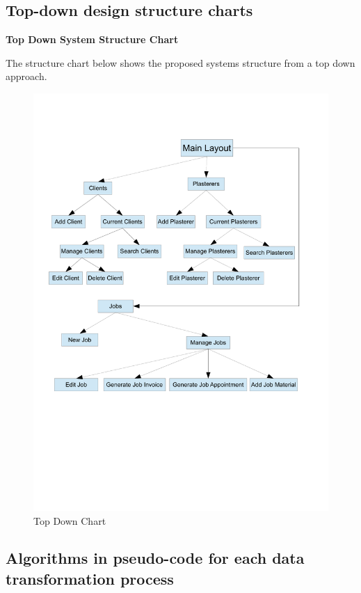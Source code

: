 \subsection{Top-down design structure charts}
\textbf{Top Down System Structure Chart}
\begin{flushleft}
The structure chart below shows the proposed systems structure from a top down approach.
\end{flushleft}
\begin{figure}[H]
\includegraphics[scale=0.4]{./Design/images/TopDownChart.pdf}
    \caption{Top Down Chart} 
\label{fig:FlowChartNewClient}
\end{figure}





\pagebreak
\subsection{Algorithms in pseudo-code for each data transformation process}

